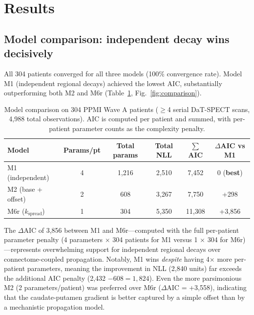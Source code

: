 \section{Results}

\subsection{Model comparison: independent decay wins decisively}

All 304 patients converged for all three models (100\% convergence rate). Model M1 (independent regional decays) achieved the lowest AIC, substantially outperforming both M2 and M6r (Table~\ref{tab:comparison}, Fig.~\ref{fig:comparison}).

\begin{table}[H]
\centering
\caption{Model comparison on 304 PPMI Wave A patients ($\geq$4 serial DaT-SPECT scans, 4,988 total observations). AIC is computed per patient and summed, with per-patient parameter counts as the complexity penalty.}
\label{tab:comparison}
\begin{tabular}{@{}lccccc@{}}
\toprule
Model & Params/pt & Total params & Total NLL & $\sum$AIC & $\Delta$AIC vs M1 \\
\midrule
M1 (independent) & 4 & 1,216 & 2,510 & 7,452 & 0 (\textbf{best}) \\
M2 (base + offset) & 2 & 608 & 3,267 & 7,750 & +298 \\
M6r ($k_{\text{spread}}$) & 1 & 304 & 5,350 & 11,308 & +3,856 \\
\bottomrule
\end{tabular}
\end{table}

The $\Delta$AIC of 3,856 between M1 and M6r---computed with the full per-patient parameter penalty (4 parameters $\times$ 304 patients for M1 versus 1 $\times$ 304 for M6r)---represents overwhelming support for independent regional decays over connectome-coupled propagation. Notably, M1 wins \textit{despite} having 4$\times$ more per-patient parameters, meaning the improvement in NLL (2,840 units) far exceeds the additional AIC penalty (2,432 $- 608 = 1{,}824$). Even the more parsimonious M2 (2 parameters/patient) was preferred over M6r ($\Delta$AIC = +3,558), indicating that the caudate-putamen gradient is better captured by a simple offset than by a mechanistic propagation model.

